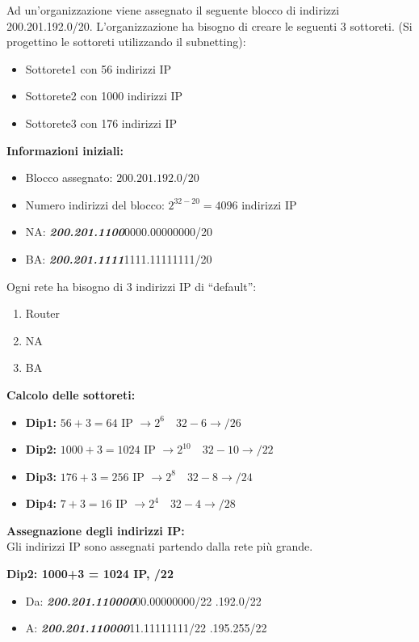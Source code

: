 \documentclass[12pt]{report}
\begin{document}
\begin{tcolorbox}[breakable, title={Esempio di Subnetting}]
	Ad un’organizzazione viene assegnato il seguente blocco di indirizzi 200.201.192.0/20. L’organizzazione ha bisogno di creare le seguenti 3 sottoreti. (Si progettino le sottoreti utilizzando il subnetting):
	\begin{itemize}
		\item Sottorete1 con 56 indirizzi IP
		\item Sottorete2 con 1000 indirizzi IP
		\item Sottorete3 con 176 indirizzi IP
	\end{itemize}
	\textbf{Informazioni iniziali:}
	\begin{itemize}
		\item Blocco assegnato: $200.201.192.0/20$
		\item Numero indirizzi del blocco: $2^{32-20} = 4096$ indirizzi IP
		\item NA: \textbf{\textit{200.201.1100}}0000.00000000/20
		\item BA: \textbf{\textit{200.201.1111}}1111.11111111/20
	\end{itemize}

	Ogni rete ha bisogno di 3 indirizzi IP di ``default'':
	\begin{enumerate}
		\item Router
		\item NA
		\item BA
	\end{enumerate}

	\textbf{Calcolo delle sottoreti:}
	\begin{itemize}
		\item \textbf{Dip1:} $56+3 = 64$ IP $\rightarrow 2^{6} \quad 32 - 6 \rightarrow /26$
		\item \textbf{Dip2:} $1000+3 = 1024$ IP $\rightarrow 2^{10} \quad 32 - 10 \rightarrow /22$
		\item \textbf{Dip3:} $176+3 = 256$ IP $\rightarrow 2^{8}\quad 32 - 8 \rightarrow /24$
		\item \textbf{Dip4:} $7+3 = 16$ IP $\rightarrow 2^{4} \quad 32 - 4 \rightarrow /28$
	\end{itemize}

	\textbf{Assegnazione degli indirizzi IP:}\\
	Gli indirizzi IP sono assegnati partendo dalla rete più grande.

	\medskip
	\textbf{Dip2: 1000+3 = 1024 IP, /22}
	\begin{itemize}
		\item Da: \textbf{\textit{200.201.110000}}00.00000000/22 .192.0/22 
		\item A: \textbf{\textit{200.201.110000}}11.11111111/22 .195.255/22
	\end{itemize}


\end{tcolorbox}
\end{document}
